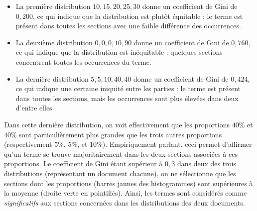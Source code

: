 \medskip

\begin{itemize}
\item La première distribution $ 10, 15, 20, 25, 30 $ donne un coefficient de Gini de $ 0,200 $, ce qui indique que la distribution est plutôt équitable : le terme est présent dans toutes les sections avec une faible différence des occurrences.
\item La deuxième distribution $ 0, 0, 0, 10, 90 $ donne un coefficient de Gini de $ 0,760 $, ce qui indique que la distribution est inéquitable : quelques sections concentrent toutes les occurrences du terme.
\item La dernière distribution $ 5, 5, 10, 40, 40 $ donne un coefficient de Gini de $ 0,424 $, ce qui indique une certaine iniquité entre les parties : le terme est présent dans toutes les sections, mais les occurrences sont plus élevées dans deux d'entre elles.
\end{itemize}
Dans cette dernière distribution, on voit effectivement que les proportions $ 40 \% $ et $ 40 \% $ sont particulièrement plus grandes que les trois autres proportions (respectivement $ 5 \% $, $ 5 \% $, et $ 10 \% $).
Empiriquement parlant, ceci permet d'affirmer qu'un terme se trouve majoritairement dans les deux sections associées à ces proportions.
Le coefficient de Gini étant supérieur à $ 0,3 $ dans deux des trois distributions (représentant un document chacune), on ne sélectionne que les sections dont les proportions (barres jaunes des histogrammes) sont supérieures à la moyenne (droite verte en pointillés).
Ainsi, les termes sont considérés comme \textit{significatifs} aux sections concernées dans les distributions des deux documents.


